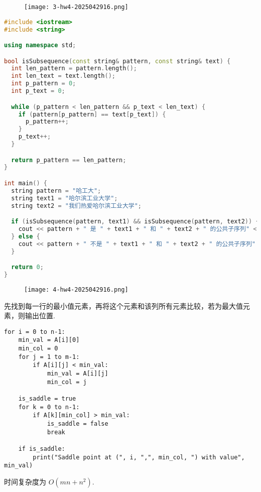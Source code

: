 \begin{exercise}
\begin{figure}[H]
\centering
\texttt{[image: 3-hw4-2025042916.png]}
\label{}
\end{figure}
\end{exercise}
\begin{lstlisting}[language=C++]
#include <iostream>
#include <string>

using namespace std;

bool isSubsequence(const string& pattern, const string& text) {
  int len_pattern = pattern.length();
  int len_text = text.length();
  int p_pattern = 0;
  int p_text = 0;

  while (p_pattern < len_pattern && p_text < len_text) {
    if (pattern[p_pattern] == text[p_text]) {
      p_pattern++;
    }
    p_text++;
  }

  return p_pattern == len_pattern;
}

int main() {
  string pattern = "哈工大";
  string text1 = "哈尔滨工业大学";
  string text2 = "我们热爱哈尔滨工业大学";

  if (isSubsequence(pattern, text1) && isSubsequence(pattern, text2)) {
    cout << pattern + " 是 " + text1 + " 和 " + text2 + " 的公共子序列" << endl;
  } else {
    cout << pattern + " 不是 " + text1 + " 和 " + text2 + " 的公共子序列" << endl;
  }

  return 0;
}
\end{lstlisting}
\begin{exercise}
\begin{figure}[H]
\centering
\texttt{[image: 4-hw4-2025042916.png]}
\label{}
\end{figure}
\end{exercise}
先找到每一行的最小值元素，再将这个元素和该列所有元素比较，若为最大值元素，则输出位置.

\begin{lstlisting}
for i = 0 to n-1:
    min_val = A[i][0]
    min_col = 0
    for j = 1 to m-1:
        if A[i][j] < min_val:
            min_val = A[i][j]
            min_col = j

    is_saddle = true
    for k = 0 to n-1:
        if A[k][min_col] > min_val:
            is_saddle = false
            break

    if is_saddle:
        print("Saddle point at (", i, ",", min_col, ") with value", min_val)

\end{lstlisting}
时间复杂度为 $O(mn+n^2)$.

